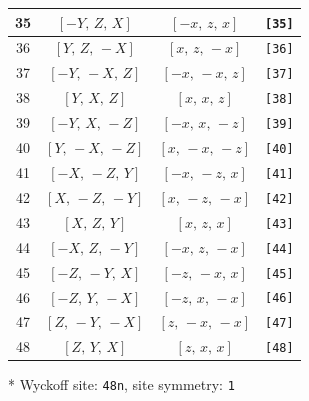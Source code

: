 \documentclass[fleqn,8pt]{jsarticle}
\begin{document}
\begin{longtable}{cccc}
35 & $\left[ - Y,\, Z,\, X \right]$ & $\left[ - x,\, z,\, x \right]$ & {\tt [35]} \\ \hline
36 & $\left[ Y,\, Z,\, - X \right]$ & $\left[ x,\, z,\, - x \right]$ & {\tt [36]} \\ \hline
37 & $\left[ - Y,\, - X,\, Z \right]$ & $\left[ - x,\, - x,\, z \right]$ & {\tt [37]} \\ \hline
38 & $\left[ Y,\, X,\, Z \right]$ & $\left[ x,\, x,\, z \right]$ & {\tt [38]} \\ \hline
39 & $\left[ - Y,\, X,\, - Z \right]$ & $\left[ - x,\, x,\, - z \right]$ & {\tt [39]} \\ \hline
40 & $\left[ Y,\, - X,\, - Z \right]$ & $\left[ x,\, - x,\, - z \right]$ & {\tt [40]} \\ \hline
41 & $\left[ - X,\, - Z,\, Y \right]$ & $\left[ - x,\, - z,\, x \right]$ & {\tt [41]} \\ \hline
42 & $\left[ X,\, - Z,\, - Y \right]$ & $\left[ x,\, - z,\, - x \right]$ & {\tt [42]} \\ \hline
43 & $\left[ X,\, Z,\, Y \right]$ & $\left[ x,\, z,\, x \right]$ & {\tt [43]} \\ \hline
44 & $\left[ - X,\, Z,\, - Y \right]$ & $\left[ - x,\, z,\, - x \right]$ & {\tt [44]} \\ \hline
45 & $\left[ - Z,\, - Y,\, X \right]$ & $\left[ - z,\, - x,\, x \right]$ & {\tt [45]} \\ \hline
46 & $\left[ - Z,\, Y,\, - X \right]$ & $\left[ - z,\, x,\, - x \right]$ & {\tt [46]} \\ \hline
47 & $\left[ Z,\, - Y,\, - X \right]$ & $\left[ z,\, - x,\, - x \right]$ & {\tt [47]} \\ \hline
48 & $\left[ Z,\, Y,\, X \right]$ & $\left[ z,\, x,\, x \right]$ & {\tt [48]} \\
\end{longtable}
* Wyckoff site: {\tt 48n}, site symmetry: {\tt 1}
\renewcommand{\arraystretch}{1.2}
\end{document}
